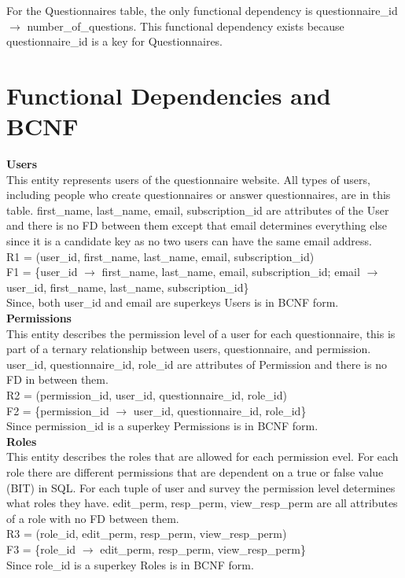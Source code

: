 \documentclass[12pt, oneside, a4paper]{article}
\newcommand{\tb}[1]{\textbf{#1}}
\begin{document}
    For the Questionnaires table, the only functional dependency is questionnaire\_id $\rightarrow$ number\_of\_questions.
    This functional dependency exists because questionnaire\_id is a key for Questionnaires.

    \newpage
    \section{Functional Dependencies and BCNF}
    \tb{Users} \\
    This entity represents users of the questionnaire website.
    All types of users, including people who create questionnaires
    or answer questionnaires, are in this table. first\_name, last\_name, email, subscription\_id are attributes of the User and there is no FD between them except that email determines everything else since it is a candidate key as no two users can have the same email address. \\
    R1 = (user\_id, first\_name, last\_name, email, subscription\_id) \\
    F1 = \{user\_id \(\rightarrow\) first\_name, last\_name, email, subscription\_id; email \(\rightarrow\) user\_id, first\_name, last\_name, subscription\_id\} \\
    Since, both user\_id and email are superkeys Users is in BCNF form. 
    \\

    \tb{Permissions} \\
    This entity describes the permission level of a user for each 
    questionnaire, this is part of a ternary relationship between users, questionnaire, and permission. user\_id, questionnaire\_id, role\_id are attributes of Permission and there is no FD in between them. \\
    R2 = (permission\_id, user\_id, questionnaire\_id, role\_id) \\
    F2 = \{permission\_id \(\rightarrow\) user\_id, questionnaire\_id, role\_id\} \\
    Since permission\_id is a superkey Permissions is in BCNF form. 
    \\
    
    \tb{Roles} \\
    This entity describes the roles that are allowed for each permission evel. For each role there are different permissions that are dependent on a true or false value (BIT) in SQL. For each tuple of user and survey the permission level determines what roles they have. edit\_perm, resp\_perm, view\_resp\_perm are all attributes of a role with no FD between them. \\
    R3 = (role\_id, edit\_perm, resp\_perm, view\_resp\_perm) \\
    F3 = \{role\_id \(\rightarrow\) edit\_perm, resp\_perm, view\_resp\_perm\} \\
    Since role\_id is a superkey Roles is in BCNF form. 
    \\
\end{document}
